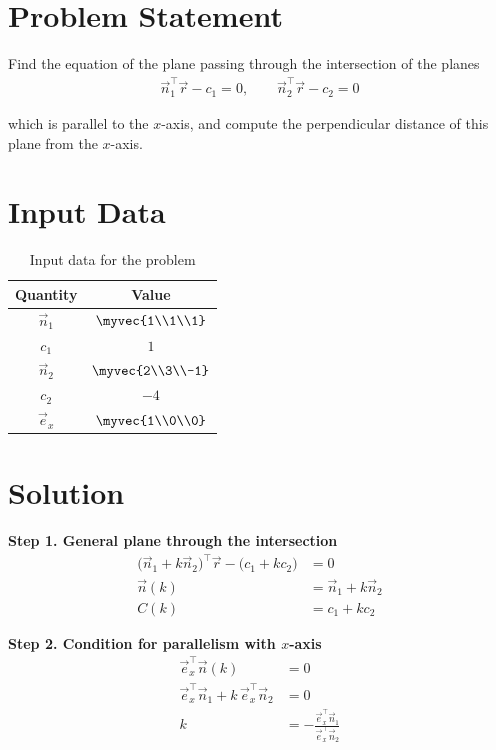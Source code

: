 \documentclass[12pt]{article}
\begin{document}
\section*{Problem Statement}
Find the equation of the plane passing through the intersection of the planes 
\begin{align}
\vec{n}_1^\top \vec{r} - c_1 = 0, 
\qquad
\vec{n}_2^\top \vec{r} - c_2 = 0
\end{align}

which is parallel to the $x$-axis, and compute the perpendicular distance of this plane from the $x$-axis.

\section*{Input Data}
\begin{table}[H]
\centering
\begin{tabular}{|c|c|}
\hline
\textbf{Quantity} & \textbf{Value} \\
\hline
$\vec{n}_1$ & $\myvec{1\\1\\1}$ \\
\hline
$c_1$ & $1$ \\
\hline
$\vec{n}_2$ & $\myvec{2\\3\\-1}$ \\
\hline
$c_2$ & $-4$ \\
\hline
$\vec{e}_x$ & $\myvec{1\\0\\0}$ \\
\hline
\end{tabular}
\caption{Input data for the problem}
\label{}
\end{table}


\section*{Solution}

\textbf{Step 1. General plane through the intersection}
\begin{align}
\big(\vec{n}_1 + k \vec{n}_2\big)^\top \vec{r} - \big(c_1 + k c_2\big) &= 0 \\
\vec{n}(k) &= \vec{n}_1 + k \vec{n}_2 \\
C(k) &= c_1 + k c_2
\end{align}

\textbf{Step 2. Condition for parallelism with $x$-axis}
\begin{align}
\vec{e}_x^\top \vec{n}(k) &= 0 \\
\vec{e}_x^\top \vec{n}_1 + k\, \vec{e}_x^\top \vec{n}_2 &= 0 \\
k &= -\frac{\vec{e}_x^\top \vec{n}_1}{\vec{e}_x^\top \vec{n}_2}
\end{align}
\end{document}
